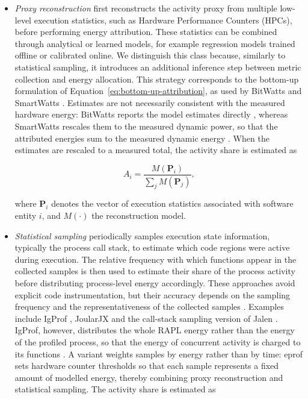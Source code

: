 \documentclass[
  acmsmall,
  screen,
  review,
  xcolor={dvipsnames,usenames}
]{acmart}
\begin{document}
\begin{itemize}
    \item \emph{Proxy reconstruction} first reconstructs the activity proxy from multiple low-level execution statistics, such as Hardware Performance Counters (HPCs), before performing energy attribution. These statistics can be combined through analytical or learned models, for example regression models trained offline or calibrated online. We distinguish this class because, similarly to statistical sampling, it introduces an additional inference step between metric collection and energy allocation. This strategy corresponds to the bottom-up formulation of Equation~\ref{eq:bottom-up-attribution}, as used by BitWatts \cite{colmantProcesslevelPowerEstimation2015} and SmartWatts \cite{fieniSmartWattsSelfCalibratingSoftwareDefined2020}. Estimates are not necessarily consistent with the measured hardware energy: BitWatts reports the model estimates directly \cite{colmantProcesslevelPowerEstimation2015}, whereas SmartWatts rescales them to the measured dynamic power, so that the attributed energies sum to the measured dynamic energy \cite{fieniSmartWattsSelfCalibratingSoftwareDefined2020}. When the estimates are rescaled to a measured total, the activity share is estimated as

    \begin{equation}
    A_i=\frac{M(\mathbf{P}_i)}
    {\sum_j M(\mathbf{P}_j)},
    \end{equation}

    where $\mathbf{P}_i$ denotes the vector of execution statistics associated with software entity $i$, and $M(\cdot)$ the reconstruction model.

    \item \emph{Statistical sampling} periodically samples execution state information, typically the process call stack, to estimate which code regions were active during execution. The relative frequency with which functions appear in the collected samples is then used to estimate their share of the process activity before distributing process-level energy accordingly. These approaches avoid explicit code instrumentation, but their accuracy depends on the sampling frequency and the representativeness of the collected samples \cite{noureddineReviewEnergyMeasurement2013}. Examples include IgProf \cite{khanEnergyProfilingUsing2015}, JoularJX \cite{noureddinePowerJoularJoularJXMultiPlatform2022} and the call-stack sampling version of Jalen \cite{noureddineMonitoringEnergyHotspots2015}. IgProf, however, distributes the whole RAPL energy rather than the energy of the profiled process, so that the energy of concurrent activity is charged to its functions \cite{khanEnergyProfilingUsing2015}. A variant weights samples by energy rather than by time: eprof \cite{schubertProfilingSoftwareEnergy2012} sets hardware counter thresholds so that each sample represents a fixed amount of modelled energy, thereby combining proxy reconstruction and statistical sampling. The activity share is estimated as


\end{itemize}
\end{document}
